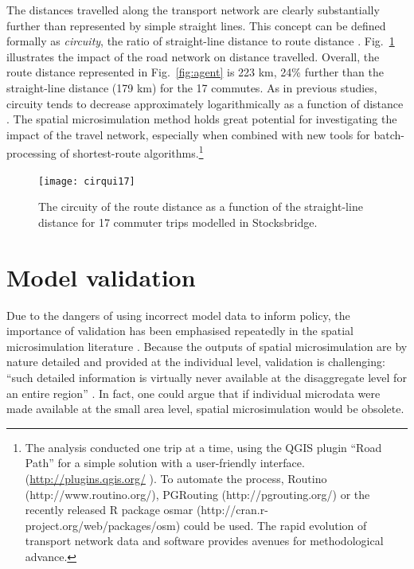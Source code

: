 The distances travelled along the transport network are clearly substantially
further than represented by simple straight lines. This concept can be
defined formally as \emph{circuity}, the ratio of straight-line distance
to route distance \citep{Ballou2002}. Fig.~\ref{f:circ} illustrates the impact
of the road network on distance travelled. Overall, the route distance
represented in Fig.~\ref{fig:agent} is 223 km, 24\% further
 than the straight-line distance (179 km) for the 17 commutes. As in previous
studies, circuity tends to decrease approximately logarithmically as a function
of distance \citep{Levinson2009}. The spatial microsimulation method holds
great potential for investigating the impact of the travel network, especially
when combined with new tools for batch-processing of shortest-route
algorithms.\footnote{The
analysis conducted one trip at a time, using the
QGIS plugin ``Road Path'' for a simple solution with a user-friendly interface.
(\href{http://docs.qgis.org/2.0/html/en/docs/user_manual/plugins/plugins_road_graph.html}
{http://plugins.qgis.org/} ).
To automate the process, Routino (http://www.routino.org/), PGRouting
(http://pgrouting.org/) or the recently released R package osmar
(http://cran.r-project.org/web/packages/osm) could be used.
The rapid evolution of transport network data and software
provides avenues for methodological advance.
}
\begin{figure}
\begin{center}
 \texttt{[image: cirqui17]}\end{center}
\caption[Circuity as a function of distance in Sheffield]
{The circuity of the route distance as a function of the
straight-line distance for 17 commuter trips modelled in Stocksbridge.}
\label{f:circ}
\end{figure}

\section{Model validation} \label{s:valid}
Due to the dangers of using incorrect model data to inform policy,
the importance of validation has been emphasised repeatedly in the
spatial microsimulation literature \citep{Holm1987, chin2006regional,
Smith2009,Clarke2010-valid, Ballas2013-4policy-analysis}.
Because the outputs of spatial microsimulation
are by nature detailed and provided at the individual level, validation
is challenging: ``such detailed information is virtually never
available at the disaggregate level for an entire region''
\citep[p.~37]{Ravulaparthy2011}. In fact, one could argue that
if individual microdata were made available at the small area level,
spatial microsimulation would be obsolete.

